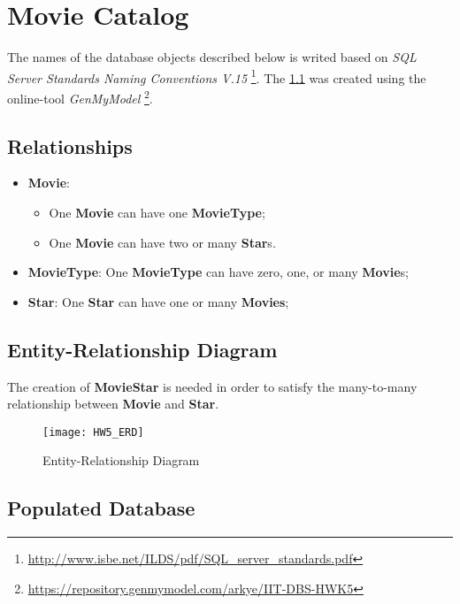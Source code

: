 \chapter{Movie Catalog}

The names of the database objects described below is writed based on \textit{SQL Server Standards Naming Conventions V.15} \footnote{\url{http://www.isbe.net/ILDS/pdf/SQL_server_standards.pdf}}. The \cref{fig:erd} was created using the online-tool \textit{GenMyModel} \footnote{\url{https://repository.genmymodel.com/arkye/IIT-DBS-HWK5}}.

\section{Relationships}

	\begin{itemize}
		\item{\textbf{Movie}:
			\begin{itemize}
				\item{One \textbf{Movie} can have one \textbf{MovieType};}
				\item{One \textbf{Movie} can have two or many \textbf{Star}s.}
			\end{itemize}}
		\item{\textbf{MovieType}: One \textbf{MovieType} can have zero, one, or many \textbf{Movie}s;}
		\item{\textbf{Star}: One \textbf{Star} can have one or many \textbf{Movies};}
	\end{itemize}

\section{Entity-Relationship Diagram}

	The creation of \textbf{MovieStar} is needed in order to satisfy the many-to-many relationship between \textbf{Movie} and \textbf{Star}.

	\begin{figure}[H]
		\begin{center}
			\texttt{[image: HW5\_ERD]}
			\caption{Entity-Relationship Diagram}
			\label{fig:erd}
		\end{center}
	\end{figure}

\section{Populated Database}

